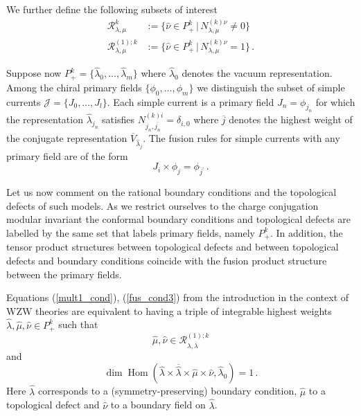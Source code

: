 \documentclass[a4paper,11pt]{article}
\theoremstyle{plain}
\theoremstyle{definition}
\def\be{\begin{equation}}
\def\ee{\end{equation}}
\newcommand{\dimh}{\operatorname{dim}\operatorname{Hom}}
\begin{document}
We further define the following subsets of interest
\begin{align}
    \mathcal{R}^k_{\lambda,\mu}&:=\{\hat{\nu}\in P_+^k\,|\, N^{(k)\nu}_{\lambda,\mu}\neq 0\} \nonumber\\
    \mathcal{R}^{(1);k}_{\lambda,\mu}&:= \{\hat{\nu}\in P_+^k\,|\, N^{(k)\nu}_{\lambda,\mu}= 1\} \,.
\end{align}

Suppose now  $P_+^k=\{\hat{\lambda}_0,\ldots,\hat{\lambda}_m\}$ where $\hat{\lambda}_0$ denotes the vacuum representation. Among the  chiral primary fields $\{\phi_0,\ldots,\phi_m\}$ we distinguish the subset of simple currents \cite{Schellekens01,Schellekens02,Fuchs01} $\mathcal{J}=\{J_0,\ldots,J_l\}$.
Each simple current is a primary field $J_{n}=\phi_{j_{n}}$ for which the representation $\hat \lambda_{j_{n}}$ satisfies
$N^{(k)i}_{j_n,\overline{j_n}}=\delta_{i,0}$ where $\overline{j}$ denotes the highest weight of the conjugate representation $\overline{V}_{\hat{\lambda}_j}$.
The fusion rules for simple currents with any  primary field 
are of the form 
\begin{equation}
    J_i\times \phi_j = \phi_{j^\prime}\, .
\end{equation}

Let us now comment on the rational boundary conditions and the topological defects of such models. As we restrict ourselves to the charge conjugation modular invariant the conformal  boundary conditions and topological defects are labelled by the same set that labels primary fields, namely $P_+^k$. In addition, the tensor product structures  between topological defects and between topological defects and boundary conditions coincide with the fusion product structure between the primary fields.

Equations (\ref{mult1_cond}), (\ref{fus_cond3}) from the introduction in the context of WZW theories  are equivalent to having 
a triple of integrable highest weights $\hat{\lambda},\hat{\mu},\hat{\nu}\in P_+^k$ such that 
\be \label{wzwproperty0}
\hat{\mu},\hat{\nu}\in \mathcal{R}^{(1);k}_{\lambda,\overline{\lambda}} 
\ee and 
\begin{equation}\label{wzwproperty}
    \dimh\left( \hat{\lambda}\times \overline{\hat{\lambda}} \times \hat{\mu}\times \hat{\nu},\hat{\lambda}_0\right)=1\,.
\end{equation}
Here $\hat{\lambda}$ corresponds to a (symmetry-preserving) boundary condition, $\hat{\mu}$ to a topological defect and $\hat{\nu}$ to a boundary field on $\hat{\lambda}$.
\end{document}
